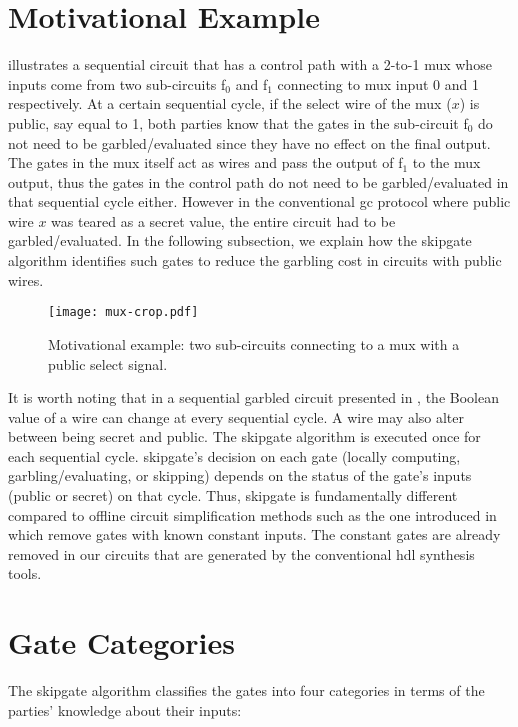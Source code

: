 \section{Motivational Example}\label{sec:skipgate-motiv}
 illustrates a sequential circuit that has a control path with a 2-to-1 \acrshort{mux} whose inputs come from two sub-circuits f$_0$ and f$_1$ connecting to \acrshort{mux} input 0 and 1 respectively.
At a certain sequential cycle, if the select wire of the \acrshort{mux} ($x$) is public, say equal to 1, both parties know that the gates in the sub-circuit f$_0$ do not need to be garbled/evaluated since they have no effect on the final output.
The gates in the \acrshort{mux} itself act as wires and pass the output of f$_1$ to the \acrshort{mux} output, thus the gates in the control path do not need to be garbled/evaluated in that sequential cycle either.
However in the conventional \acrshort{gc} protocol where public wire $x$ was teared as a secret value, the entire circuit had to be garbled/evaluated.
In the following subsection, we explain how the \gls{skipgate} algorithm identifies such gates to reduce the garbling cost in circuits with public wires.

\begin{figure}
    \centering
    \texttt{[image: mux-crop.pdf]}
    \caption{Motivational example: two sub-circuits connecting to a \acrshort{mux} with a public select signal.}
\label{fig:mux}
\end{figure}

It is worth noting that in a sequential garbled circuit presented in , the Boolean value of a wire can change at every sequential cycle.
A wire may also alter between being secret and public.
The \gls{skipgate} algorithm is executed once for each sequential cycle.
\gls{skipgate}'s decision on each gate (locally computing, garbling/evaluating, or skipping) depends on the status of the gate's inputs (public or secret) on that cycle.
Thus, \gls{skipgate} is fundamentally different compared to offline circuit simplification methods such as the one introduced in~\cite{pinkas2009secure} which remove gates with known constant inputs.
The constant gates are already removed in our circuits that are generated by the conventional \acrshort{hdl} synthesis tools.

\section{Gate Categories}\label{sec:skipgate-cat}
The \gls{skipgate} algorithm classifies the gates into four categories in terms of the parties' knowledge about their inputs:

